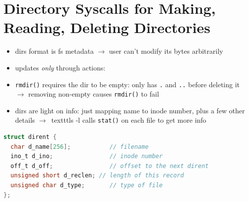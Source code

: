 \section*{Directory Syscalls for Making, Reading, Deleting Directories}
\begin{itemize}
\item dirs format is fs metadata $\to$ user can’t modify its bytes arbitrarily
\item updates \emph{only} through  actions:
\item \texttt{rmdir()} requires the dir to be empty: only has \texttt{.} and \texttt{..} before deleting it $\to$ removing non-empty causes \texttt{rmdir()} to fail
\item dirs are light on info: just mapping name to inode number, plus a few other details $\to$\ texttt{ls -l} calls \texttt{stat()} on each file to get more info
\end{itemize}
\begin{lstlisting}[language=c]
struct dirent {
  char d_name[256];           // filename
  ino_t d_ino;                // inode number
  off_t d_off;                // offset to the next dirent
  unsigned short d_reclen; // length of this record
  unsigned char d_type;       // type of file
};
\end{lstlisting}
